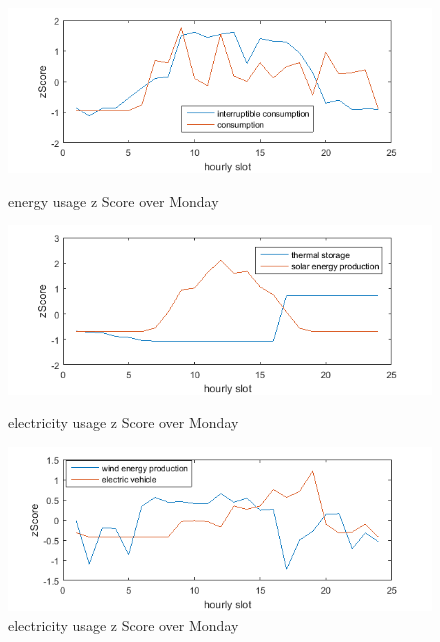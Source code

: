 \begin{figure}
\centering
\includegraphics[scale=0.9]{daily1.png}
\caption{energy usage z Score over Monday}
\label{fig:daily1}
\includegraphics[scale=0.9]{daily2.png}
\caption{electricity usage z Score over Monday}
\label{fig:daily2}
\includegraphics[scale=0.9]{daily3.png}
\caption{electricity usage z Score over Monday}
\label{fig:daily3}
\end{figure}

